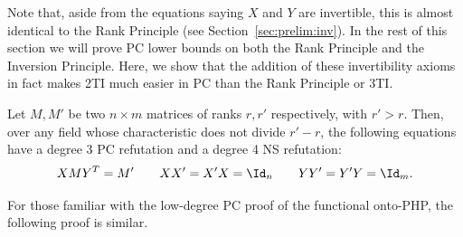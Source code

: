 Note that, aside from the equations saying $X$ and $Y$ are invertible, this is almost identical to the Rank Principle (see Section~\ref{sec:prelim:inv}). In the rest of this section we will prove PC lower bounds on both the Rank Principle and the Inversion Principle. Here, we show that the addition of these invertibility axioms in fact makes 2TI much easier in PC than the Rank Principle or 3TI.

\begin{proposition}
Let $M,M'$ be two $n \times m$ matrices of  ranks $r,r'$ respectively, with $r' > r$. Then, over any field whose characteristic does not divide $r'-r$, the following equations have a degree 3 PC refutation and a degree 4 NS refutation:
\[
XMY^T = M' \qquad XX' = X' X = \Id_n \qquad YY' = Y' Y = \Id_m.
\]
\end{proposition}

For those familiar with the low-degree PC proof of the functional onto-PHP, the following proof is similar. 
\newcommand{\Tr}{\text{Tr}}

